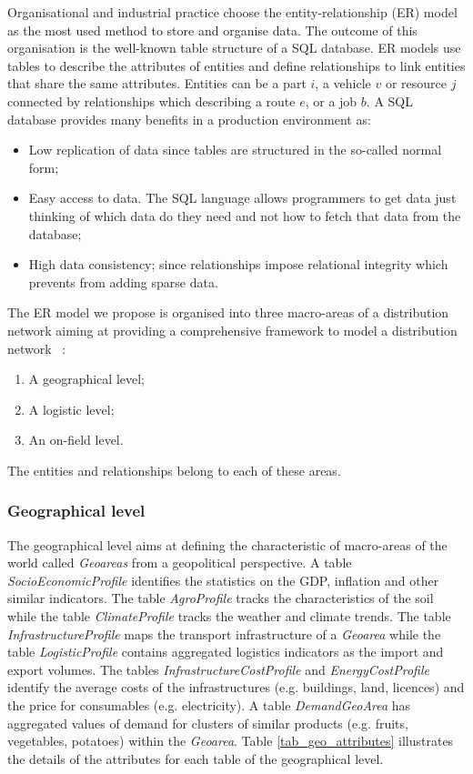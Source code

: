 Organisational and industrial practice choose the entity-relationship (ER) model as the most used method to store and organise data. The outcome of this organisation is the well-known table structure of a SQL database. ER models use tables to describe the attributes of entities and define relationships to link entities that share the same attributes. Entities can be a part $i$, a vehicle $v$ or resource $j$ connected by relationships which describing a route $e$, or a job $b$. A SQL database provides many benefits in a production environment as:
\begin{itemize}
    \item Low replication of data since tables are structured in the so-called normal form;
    \item Easy access to data. The SQL language allows programmers to get data just thinking of which data do they need and not how to fetch that data from the database;
    \item High data consistency; since relationships impose relational integrity which prevents from adding sparse data.
\end{itemize}

The ER model we propose is organised into three macro-areas of a distribution network aiming at providing a comprehensive framework to model a distribution network ~\cite{Accorsi2018_hierarch}:

\begin{enumerate}
    \item A geographical level;
    \item A logistic level;
    \item An on-field level.
\end{enumerate}

The entities and relationships belong to each of these areas.
\subsubsection{Geographical level}

The geographical level aims at defining the characteristic of macro-areas of the world called \textit{Geoareas} from a geopolitical perspective. A table \textit{SocioEconomicProfile} identifies the statistics on the GDP, inflation and other similar indicators. The table \textit{AgroProfile} tracks the characteristics of the soil while the table \textit{ClimateProfile} tracks the weather and climate trends. The table \textit{InfrastructureProfile} maps the transport infrastructure of a \textit{Geoarea} while the table \textit{LogisticProfile} contains aggregated logistics indicators as the import and export volumes. The tables \textit{InfrastructureCostProfile} and \textit{EnergyCostProfile} identify the average costs of the infrastructures (e.g. buildings, land, licences) and the price for consumables (e.g. electricity). A table \textit{DemandGeoArea} has aggregated values of demand for clusters of similar products (e.g. fruits, vegetables, potatoes) within the \textit{Geoarea}. Table \ref{tab_geo_attributes} illustrates the details of the attributes for each table of the geographical level.


